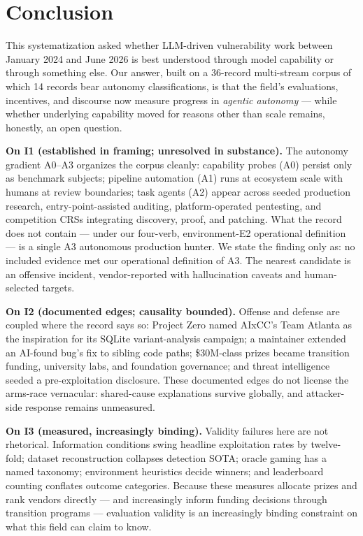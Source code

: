 \section{Conclusion}
\label{sec:conclusion}

This systematization asked whether LLM-driven vulnerability work between January 2024 and June
2026 is best understood through model capability or through something else. Our answer, built
on a 36-record multi-stream corpus of which 14 records bear autonomy classifications, is that
the field's evaluations, incentives, and discourse now measure progress in \emph{agentic
autonomy} --- while whether underlying capability moved for reasons other than scale remains,
honestly, an open question.

\textbf{On I1 (established in framing; unresolved in substance).} The autonomy gradient A0--A3
organizes the corpus cleanly: capability probes (A0) persist only as benchmark subjects;
pipeline automation (A1) runs at ecosystem scale with humans at review boundaries; task agents
(A2) appear across seeded production research, entry-point-assisted auditing, platform-operated
pentesting, and competition CRSs integrating discovery, proof, and patching. What the record
does not contain --- under our four-verb, environment-E2 operational definition --- is a single
A3 autonomous production hunter. We state the finding only as: no included evidence met our
operational definition of A3. The nearest candidate is an offensive incident,
vendor-reported with hallucination caveats and human-selected targets.

\textbf{On I2 (documented edges; causality bounded).} Offense and defense are coupled where the
record says so: Project Zero named AIxCC's Team Atlanta as the inspiration for its SQLite
variant-analysis campaign; a maintainer extended an AI-found bug's fix to sibling code paths;
\$30M-class prizes became transition funding, university labs, and foundation governance; and
threat intelligence seeded a pre-exploitation disclosure. These documented edges do not license
the arms-race vernacular: shared-cause explanations survive globally, and attacker-side
response remains unmeasured.

\textbf{On I3 (measured, increasingly binding).} Validity failures here are not rhetorical.
Information conditions swing headline exploitation rates by twelve-fold; dataset
reconstruction collapses detection SOTA; oracle gaming has a named taxonomy; environment
heuristics decide winners; and leaderboard counting conflates outcome categories. Because
these measures allocate prizes and rank vendors directly --- and increasingly inform funding
decisions through transition programs --- evaluation validity is an increasingly binding
constraint on what this field can claim to know.

